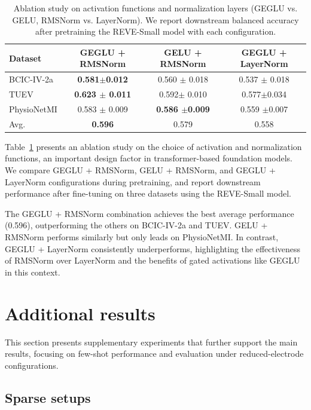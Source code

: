 \documentclass{article}
\begin{document}
\begin{table}[!ht]
    \centering
    \caption{Ablation study on activation functions and normalization layers (GEGLU vs. GELU, RMSNorm vs. LayerNorm). We report downstream balanced accuracy after pretraining the REVE-Small model with each configuration.}
    \begin{tabular}{lccc}
    \toprule
        \textbf{Dataset} & \textbf{GEGLU + RMSNorm} & \textbf{GELU + RMSNorm} & \textbf{GEGLU + LayerNorm} \\
        \midrule
        BCIC-IV-2a & \textbf{0.581$\pm$0.012} & 0.560 $\pm$ 0.018 & 0.537 $\pm$ 0.018 \\
        TUEV & \textbf{0.623 $\pm$ 0.011} & 0.592$\pm$ 0.010 & 0.577$\pm$0.034 \\
        PhysioNetMI & 0.583 $\pm$ 0.009 & \textbf{0.586 $\pm$0.009} & 0.559 $\pm$0.007 \\
        \midrule
        Avg. & \textbf{0.596} & 0.579 & 0.558\\ \bottomrule
    \end{tabular}
    \label{tab:ablation_activation}
\end{table}

Table~\ref{tab:ablation_activation} presents an ablation study on the choice of activation and normalization functions, an important design factor in transformer-based foundation models. We compare GEGLU + RMSNorm, GELU + RMSNorm, and GEGLU + LayerNorm configurations during pretraining, and report downstream performance after fine-tuning on three datasets using the REVE-Small model.

The GEGLU + RMSNorm combination achieves the best average performance (0.596), outperforming the others on BCIC-IV-2a and TUEV. GELU + RMSNorm performs similarly but only leads on PhysioNetMI. In contrast, GEGLU + LayerNorm consistently underperforms, highlighting the effectiveness of RMSNorm over LayerNorm and the benefits of gated activations like GEGLU in this context.


\section{Additional results}
\label{sec:add_results}

This section presents supplementary experiments that further support the main results, focusing on few-shot performance and evaluation under reduced-electrode configurations.

\subsection{Sparse setups}
\label{subsec:sparse_setups}
\end{document}
